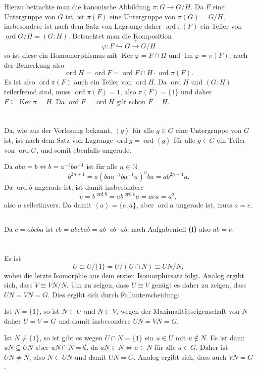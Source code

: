 \documentclass[a4paper,10pt]{article}
\theoremstyle{definition}
\newcommand{\N}{\mathbb{N}}
\newcommand{\ord}{\operatorname{ord}}
\newcommand{\Img}{\operatorname{Im}}
\newcommand{\Ker}{\operatorname{Ker}}
\newcommand{\gen}[1]{\left\langle#1\right\rangle}
\begin{document}
Hierzu betrachte man die kanonische Abbildung $\pi : G \rightarrow G/H$. Da $F$ eine Untergruppe von $G$ ist, ist $\pi(F)$ eine Untergruppe von $\pi(G) = G/H$, insbesondere ist nach dem Satz von Lagrange daher $\ord \pi(F)$ ein Teiler von $\ord G/H = (G : H)$. Betrachtet man die Komposition
\[
 \varphi: F \hookrightarrow G \xrightarrow{\pi} G/H
\]
so ist diese ein Homomorphismus mit $\Ker \varphi = F \cap H$ und $\Img \varphi = \pi(F)$, nach der Bemerkung also
\[
 \ord H = \ord F = \ord F \cap H \cdot \ord \pi(F).
\]
Es ist also $\ord \pi(F)$ auch ein Teiler von $\ord H$. Da $\ord H$ und $(G : H)$ teilerfremd sind, muss $\ord \pi(F) = 1$, also $\pi(F) = \{1\}$ und daher $F \subseteq \Ker \pi = H$. Da $\ord F = \ord H$ gilt schon $F = H$.









\section{}


\subsection{}
Da, wie aus der Vorlesung bekannt, $\gen{g}$ für alle $g \in G$ eine Untergruppe von $G$ ist, ist nach dem Satz von Lagrange $\ord g = \ord \gen{g}$ für alle $g \in G$ ein Teiler von $\ord G$, und somit ebenfalls ungerade.

Da $aba = b \Leftrightarrow b = a^{-1} b a^{-1}$ ist für alle $n \in \N$
\[
 b^{2n+1} = a (b a a^{-1} b a^{-1} a)^n ba = ab^{2n+1}a.
\]
Da $\ord b$ ungerade ist, ist damit insbesondere
\[
 e = b^{\ord b} = ab^{\ord b}a = aea = a^2,
\]
also $a$ selbstinvers. Da damit $\gen{a} = \{e, a\}$, aber $\ord a$ ungerade ist, muss $a = e$.



\subsection{}
Da $c = abcba$ ist $cb = abcbab = ab \cdot cb \cdot ab$, nach Aufgabenteil \textbf{(i)} also $ab = e$.




\section{}
Es ist
\[
 U \cong U / \{1\} = U / (U \cap N) \cong UN/N,
\]
wobei die letzte Isomorphie aus dem ersten Isomorphiesatz folgt. Analog ergibt sich, dass $V \cong VN/N$. Um zu zeigen, dass $U \cong V$ genügt es daher zu zeigen, dass \mbox{$UN = VN = G$}. Dies ergibt sich durch Fallunterscheidung:

Ist $N = \{1\}$, so ist $N \subset U$ und $N \subset V$, wegen der Maximalitätseigenschaft von $N$ daher $U=V=G$ und damit insbesondere $UN=VN=G$.

Ist $N \neq \{1\}$, so ist gibt es wegen $U \cap N = \{1\}$ ein $u \in U$ mit $u \not \in N$. Es ist dann $uN \subseteq{UN}$ aber $uN \cap N = \emptyset$, da $aN \in N \Leftrightarrow a \in N$ für alle $a \in G$. Daher ist $UN \neq N$, also $N \subset UN$ und damit $UN = G$. Analog ergibt sich, dass auch $VN = G$.
\end{document}
